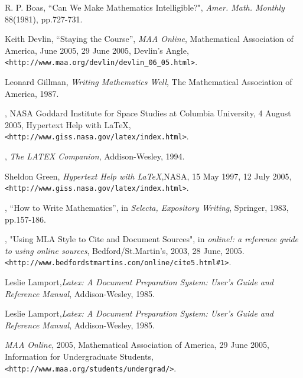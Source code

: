 \newpage
\begin{thebibliography}{99}
\setlength{\baselineskip}{12pt}%


 {\sc R. P. Boas}, ``Can We Make Mathematics
Intelligible?", {\em Amer. Math. Monthly} 88(1981),
pp.727-731.

 {\sc Keith Devlin}, ``Staying the
Course'', {\em MAA Online}, Mathematical Association of
America, June 2005, 29 June 2005, Devlin's Angle,
\verb+<http://www.maa.org/devlin/devlin_06_05.html>+.

 {\sc Leonard Gillman}, {\em Writing
Mathematics Well}, The Mathematical Association of
America, 1987.

, NASA Goddard Institute for Space Studies at
Columbia University, 4 August 2005, Hypertext Help with
LaTeX, \verb+<http://www.giss.nasa.gov/latex/index.html>+.

, {\em The LATEX Companion},
Addison-Wesley, 1994.

 {\sc Sheldon Green}, {\em Hypertext Help
with LaTeX},NASA, 15 May 1997, 12 July 2005,
\verb+<http://www.giss.nasa.gov/latex/index.html>+.

, ``How to Write
Mathematics'',
in {\em Selecta, Expository Writing}, Springer, 1983, pp.157-186.

, "Using MLA Style
to Cite and Document Sources", in
{\em online!: a reference guide to using online sources},
Bedford/St.Martin's, 2003, 28 June, 2005.
\verb+<http://www.bedfordstmartins.com/online/cite5.html#1>+.

 {\sc Leslie Lamport},{\em Latex: A
Document Preparation System: User's Guide and Reference
Manual}, Addison-Wesley, 1985.

 {\sc Leslie Lamport},{\em Latex: A
Document Preparation System: User's Guide and Reference
Manual}, Addison-Wesley, 1985.

 {\em MAA Online}, 2005,
Mathematical Association of America, 29 June 2005,
Information for Undergraduate Students,
\verb+<http://www.maa.org/students/undergrad/>+.
\end{thebibliography} 

